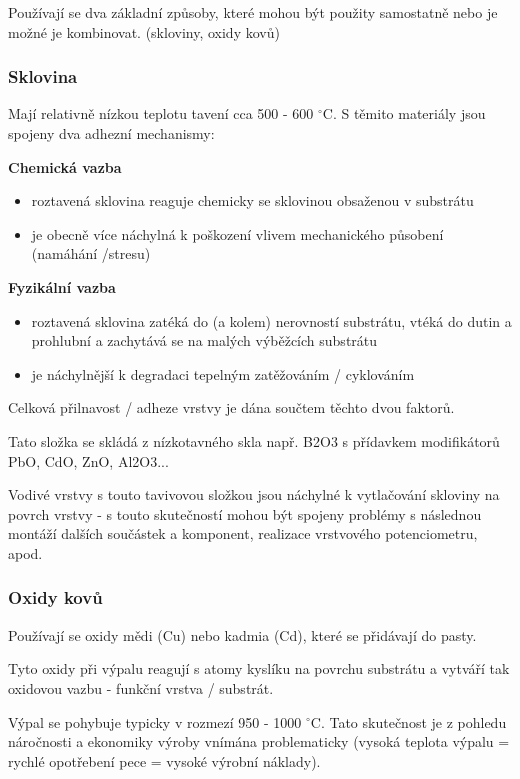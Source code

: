 Používají se dva základní způsoby, které mohou být použity
samostatně nebo je možné je kombinovat. (skloviny, oxidy kovů)

\subsubsection*{Sklovina}
Mají relativně nízkou teplotu tavení cca 500 - 600 $^{\circ}$C. S těmito materiály jsou spojeny dva adhezní mechanismy:

\textbf{Chemická vazba}
\begin{itemize}
\item roztavená sklovina reaguje chemicky se sklovinou obsaženou v substrátu
\item je obecně více náchylná k poškození vlivem mechanického působení (namáhání /stresu)
\end{itemize}

\textbf{Fyzikální vazba}
\begin{itemize}
\item roztavená sklovina zatéká do (a kolem) nerovností substrátu, vtéká do
dutin a prohlubní a zachytává se na malých výběžcích substrátu
\item je náchylnější k degradaci tepelným zatěžováním / cyklováním
\end{itemize}

Celková přilnavost / adheze vrstvy je dána součtem těchto dvou faktorů.

Tato složka se skládá z nízkotavného skla např. B2O3 s přídavkem modifikátorů PbO, CdO, ZnO, Al2O3...

Vodivé vrstvy s touto tavivovou složkou jsou náchylné k vytlačování skloviny na povrch
vrstvy - s touto skutečností mohou být spojeny problémy s následnou montáží dalších
součástek a komponent, realizace vrstvového potenciometru, apod.

\subsubsection*{Oxidy kovů}

Používají se oxidy mědi (Cu) nebo kadmia (Cd), které se přidávají do pasty.

Tyto oxidy při výpalu reagují s atomy kyslíku na povrchu substrátu a vytváří tak
oxidovou vazbu - funkční vrstva / substrát.

Výpal se pohybuje typicky v rozmezí 950 - 1000 $^{\circ}$C. Tato skutečnost je z pohledu náročnosti a ekonomiky výroby vnímána problematicky (vysoká teplota výpalu = rychlé opotřebení pece = vysoké výrobní náklady).

